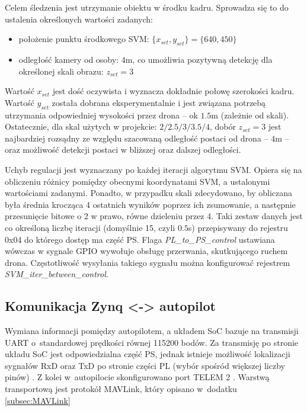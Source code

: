 Celem śledzenia jest utrzymanie obiektu w środku kadru. Sprowadza się to do ustalenia określonych wartości zadanych:
\begin{itemize}
	\item położenie punktu środkowego SVM: $\{x_{set},y_{set}\}=\{640,450\}$ 
	\item odległość kamery od osoby: $4$m, co umożliwia pozytywną detekcję dla określonej skali obrazu: $z_{set}=3$
\end{itemize}

Wartość $x_{set}$ jest dość oczywista i wyznacza dokładnie połowę szerokości kadru.
Wartość $y_{set}$ została dobrana eksperymentalnie i jest związana potrzebą utrzymania odpowiedniej wysokości przez drona -- ok $1.5$m (zależnie od skali).
Ostatecznie, dla skal użytych w projekcie: $2/2.5/3/3.5/4$, dobór $z_{set}=3$ jest najbardziej rozsądny ze względu szacowaną odległość postaci od drona -- $4$m -- oraz możliwość detekcji postaci w bliższej oraz dalszej odległości.

Uchyb regulacji jest wyznaczany po każdej iteracji algorytmu SVM. 
Opiera się na obliczeniu różnicy pomiędzy obecnymi koordynatami SVM, a ustalonymi wartościami zadanymi.
Ponadto, w przypadku skali zdecydowano, by obliczana była średnia krocząca 4 ostatnich wyników poprzez ich zsumowanie, a następnie przesunięcie bitowe o 2 w prawo, równe dzieleniu przez 4.
Taki zestaw danych jest co określoną liczbę iteracji (domyślnie 15, czyli $0.5$s) przepisywany do rejestru 0x04 do którego dostęp ma część PS. Flaga \textit{PL\_to\_PS\_control} ustawiana wówczas w sygnale GPIO wywołuje obsługę przerwania, skutkującego ruchem drona. 
Częstotliwość wysyłania takiego sygnału można konfigurować rejestrem \textit{SVM\_iter\_between\_control}.


\subsection{Komunikacja Zynq <-> autopilot} 

Wymiana informacji pomiędzy autopilotem, a układem SoC bazuje na transmisji UART o~standardowej prędkości równej 115200 bodów. 
Za transmisję po stronie układu SoC jest odpowiedzialna część PS, jednak istnieje możliwość lokalizacji sygnałów RxD oraz TxD po stronie części PL (wybór spośród większej liczby pinów) \cite{PYNQ_sch}. 
Z kolei w~autopilocie skonfigurowano port TELEM 2 \cite{PixhawkSerial}. 
Warstwą transportową jest protokół MAVLink, który opisano w~dodatku \ref{subsec:MAVLink}


